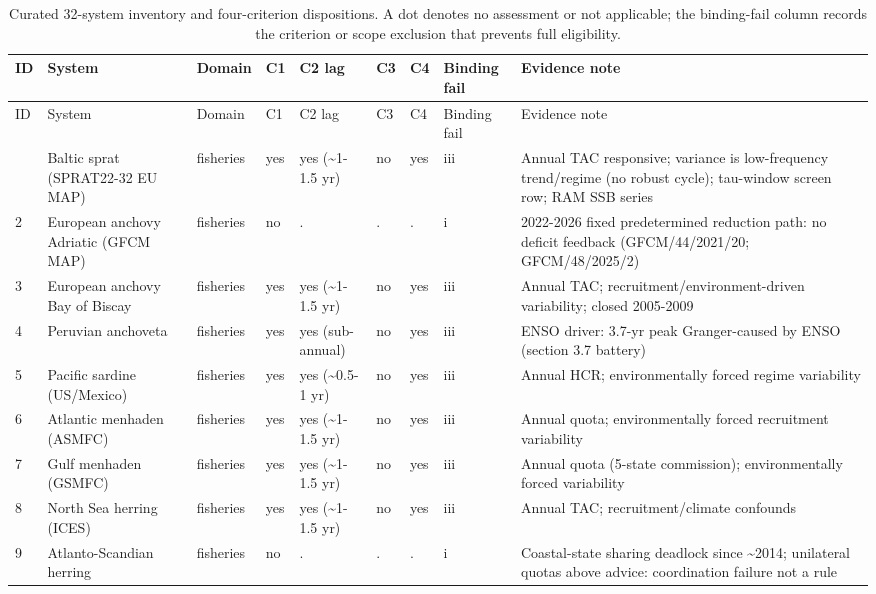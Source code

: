 \begin{landscape}
\scriptsize
\setlength{\tabcolsep}{3pt}
\begin{longtable}{@{}p{0.55cm}p{3.3cm}p{1.6cm}p{1.0cm}p{1.6cm}p{1.05cm}p{1.0cm}p{1.0cm}p{10.8cm}@{}}
\caption{Curated 32-system inventory and four-criterion dispositions. A dot denotes no assessment or not applicable; the binding-fail column records the criterion or scope exclusion that prevents full eligibility.}\label{tab:case-inventory}\\
\toprule ID & System & Domain & C1 & C2 lag & C3 & C4 & Binding fail & Evidence note \\
\midrule\endfirsthead
\toprule ID & System & Domain & C1 & C2 lag & C3 & C4 & Binding fail & Evidence note \\
\midrule\endhead
\bottomrule\endfoot
1 & Baltic sprat (SPRAT22-32 EU MAP) & fisheries & yes & yes (\textasciitilde{}1-1.5 yr) & no & yes & iii & Annual TAC responsive; variance is low-frequency trend/regime (no robust cycle); tau-window screen row; RAM SSB series \\
2 & European anchovy Adriatic (GFCM MAP) & fisheries & no & .  & .  & .  & i & 2022-2026 fixed predetermined reduction path: no deficit feedback (GFCM/44/2021/20; GFCM/48/2025/2) \\
3 & European anchovy Bay of Biscay & fisheries & yes & yes (\textasciitilde{}1-1.5 yr) & no & yes & iii & Annual TAC; recruitment/environment-driven variability; closed 2005-2009 \\
4 & Peruvian anchoveta & fisheries & yes & yes (sub-annual) & no & yes & iii & ENSO driver: 3.7-yr peak Granger-caused by ENSO (section 3.7 battery) \\
5 & Pacific sardine (US\allowbreak/Mexico) & fisheries & yes & yes (\textasciitilde{}0.5-1 yr) & no & yes & iii & Annual HCR; environmentally forced regime variability \\
6 & Atlantic menhaden (ASMFC) & fisheries & yes & yes (\textasciitilde{}1-1.5 yr) & no & yes & iii & Annual quota; environmentally forced recruitment variability \\
7 & Gulf menhaden (GSMFC) & fisheries & yes & yes (\textasciitilde{}1-1.5 yr) & no & yes & iii & Annual quota (5-state commission); environmentally forced variability \\
8 & North Sea herring (ICES) & fisheries & yes & yes (\textasciitilde{}1-1.5 yr) & no & yes & iii & Annual TAC; recruitment/climate confounds \\
9 & Atlanto-Scandian herring & fisheries & no & .  & .  & .  & i & Coastal-state sharing deadlock since \textasciitilde{}2014; unilateral quotas above advice: coordination failure not a rule \\

\end{longtable}
\end{landscape}

